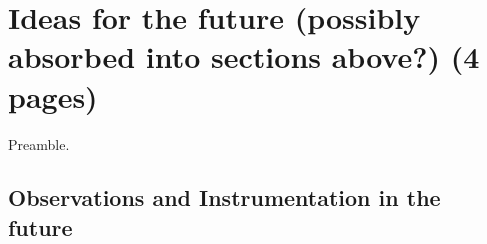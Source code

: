 \documentclass{ar2e}
\begin{document}
\section{Ideas for the future (possibly absorbed into sections above?) (4 pages)}
\label{sec:future}

Preamble.


% 
% 
% 
% 

\subsection{Observations and Instrumentation in the future}
\label{sec:future:obs}

% 
% 
% 
% 
\end{document}
